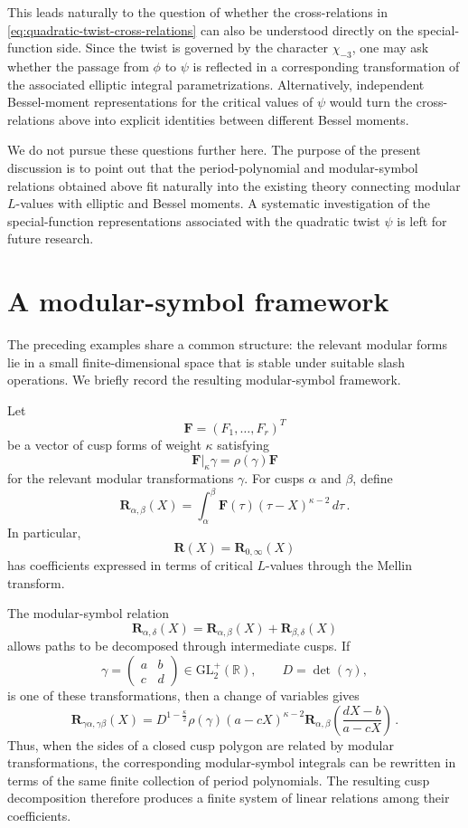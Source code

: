 \documentclass[preprint,12pt]{elsarticle}
\theoremstyle{definition}
\theoremstyle{remark}
\newcommand{\GL}{\mathrm{GL}}
\begin{document}
This leads naturally to the question of whether the cross-relations in \eqref{eq:quadratic-twist-cross-relations} can also be understood directly on the special-function side. Since the twist is governed by the character $\chi_{-3}$, one may ask whether the passage from $\phi$ to $\psi$ is reflected in a corresponding transformation of the associated elliptic integral parametrizations. Alternatively, independent Bessel-moment representations for the critical values of $\psi$ would turn the cross-relations above into explicit identities between different Bessel moments.



We do not pursue these questions further here. The purpose of the present discussion is to point out that the period-polynomial and modular-symbol relations obtained above fit naturally into the existing theory connecting modular $L$-values with elliptic and Bessel moments. A systematic investigation of the special-function representations associated with the quadratic twist $\psi$ is left for future research.





\section{A modular-symbol framework}
\label{sec:general-framework}

The preceding examples share a common structure: the relevant modular forms lie in a small finite-dimensional space that is stable under suitable slash operations. We briefly record the resulting modular-symbol framework.

Let
$$\mathbf F=(F_1,\ldots,F_r)^T$$
be a vector of cusp forms of weight $\kappa$ satisfying
$$\mathbf F|_\kappa\gamma=\rho(\gamma)\mathbf F$$
for the relevant modular transformations $\gamma$. For cusps $\alpha$ and $\beta$, define
$$\mathbf R_{\alpha,\beta}(X)=\int_\alpha^\beta\mathbf F(\tau)(\tau-X)^{\kappa-2}\,d\tau\,.$$
In particular,
$$\mathbf R(X)=\mathbf R_{0,\infty}(X)$$
has coefficients expressed in terms of critical $L$-values through the Mellin transform.

The modular-symbol relation
$$\mathbf R_{\alpha,\delta}(X)=\mathbf R_{\alpha,\beta}(X)+\mathbf R_{\beta,\delta}(X)$$
allows paths to be decomposed through intermediate cusps. If
$$\gamma=\begin{pmatrix}a&b\\c&d\end{pmatrix}\in\GL_2^+(\mathbb R),
\qquad D=\det(\gamma),$$
is one of these transformations, then a change of variables gives
$$\mathbf R_{\gamma\alpha,\gamma\beta}(X)=D^{1-\frac{\kappa}{2}}\rho(\gamma)(a-cX)^{\kappa-2}\mathbf R_{\alpha,\beta}\left(\frac{dX-b}{a-cX}\right)\,.$$
Thus, when the sides of a closed cusp polygon are related by modular transformations, the corresponding modular-symbol integrals can be rewritten in terms of the same finite collection of period polynomials. The resulting cusp decomposition therefore produces a finite system of linear relations among their coefficients.
\end{document}
